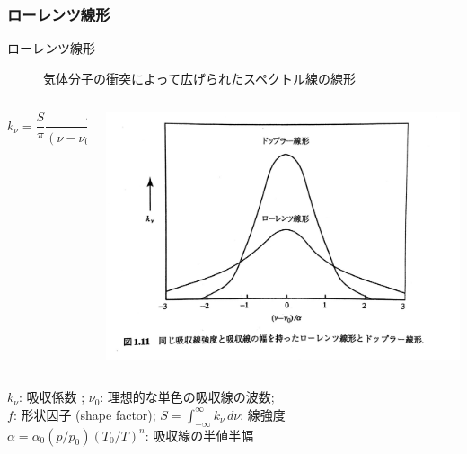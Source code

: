 \documentclass[unicode,colorlinks]{beamer}
\newcommand{\centeralign}[1]{\rule{0pt}{0pt}\hfill#1\hfill\rule{0pt}{0pt}}
\newcommand{\Unit}[1]{\,\mathrm{#1}}
\begin{document}
\begin{frame}
	\frametitle{ローレンツ線形}
	\begin{description}
		\item[ローレンツ線形] 気体分子の衝突によって広げられたスペクトル線の線形
	\end{description}

	\begin{columns}
		\begin{column}{0.6\textwidth}
			\[k_\nu=\frac{S}{\pi}\frac{\alpha}{(\nu-\nu_0)^2+\alpha^2}=Sf[\nu-\nu_0]\]
		\end{column}
		\begin{column}{0.3\textwidth}
			\centeralign{\includegraphics[width=\textwidth]{lorentz.jpg}}
		\end{column}
	\end{columns}

	$k_\nu$: 吸収係数 ;\quad
	$\nu_0$: 理想的な単色の吸収線の波数;\\
	$f$: 形状因子 (shape factor);\quad
	$\displaystyle S=\int^\infty_{-\infty}k_\nu\,d\nu$: 線強度\\
	$\alpha=\alpha_0(p/p_0)(T_0/T)^n$: 吸収線の半値半幅

\end{frame}

% 
% 
\end{document}
